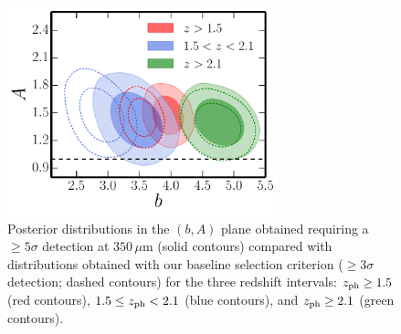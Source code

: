 \begin{figure} %
\centering %
\includegraphics[width=0.7\textwidth]{Chapter4/Images/b_A_SMM_3sigma_5sigma}
\caption{Posterior distributions in the $(b,A)$ plane obtained requiring a $\ge 5\sigma$ detection at $350\,\mu$m (solid contours) compared with distributions obtained with our baseline selection criterion ($\ge 3\sigma$ detection; dashed contours) for the three redshift intervals: $z_{\rm{ph}} \ge 1.5$ (red contours), $1.5 \le z_{\rm{ph}} < 2.1$ (blue contours), and $z_{\rm{ph}} \ge 2.1$ (green contours).
\label{fig:b_A_SMM_3sigma_5sigma}}
\end{figure}


